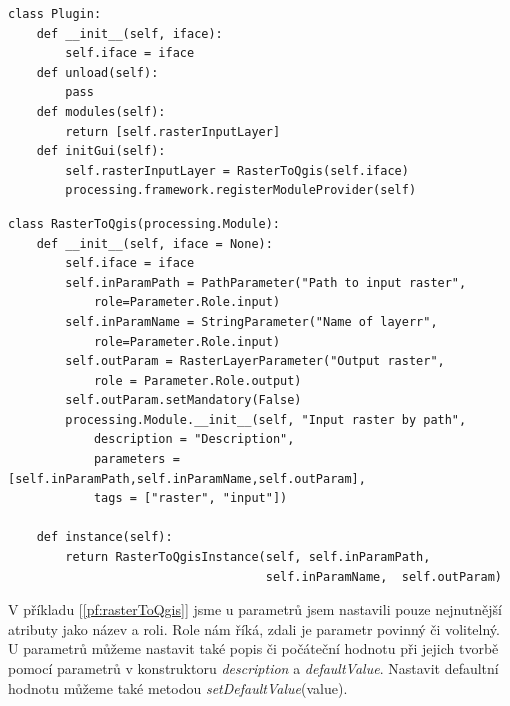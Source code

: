 \newpage
\begin{lstlisting}[caption={Třída Plugin pro QGIS Processing Framework}, label=pf:plugin, morekeywords={Plugin, __init__, modules, initGUI, unload}]
class Plugin:
    def __init__(self, iface):
        self.iface = iface
    def unload(self):
        pass
    def modules(self):
        return [self.rasterInputLayer]
    def initGui(self):
        self.rasterInputLayer = RasterToQgis(self.iface)
        processing.framework.registerModuleProvider(self)
\end{lstlisting}
\newpage
\begin{lstlisting}[caption={Třída RasterToQgis reprezentující modul pro QGIS Processing Framework}, label=pf:rasterToQgis, morekeywords={processing.Module,RasterToQgis, __init__, instance, RasterToQgisInstance, PathParameter, StringParameter, RasterLayerParameter}]
class RasterToQgis(processing.Module):
    def __init__(self, iface = None):
        self.iface = iface
        self.inParamPath = PathParameter("Path to input raster",
        	role=Parameter.Role.input)
        self.inParamName = StringParameter("Name of layerr",
        	role=Parameter.Role.input)
        self.outParam = RasterLayerParameter("Output raster",
        	role = Parameter.Role.output)
        self.outParam.setMandatory(False)
        processing.Module.__init__(self, "Input raster by path", 
            description = "Description",
            parameters = [self.inParamPath,self.inParamName,self.outParam], 
            tags = ["raster", "input"])

    def instance(self):
        return RasterToQgisInstance(self, self.inParamPath,
        							self.inParamName,  self.outParam)
\end{lstlisting}

V příkladu [\autoref{pf:rasterToQgis}] jsme u parametrů jsem nastavili pouze nejnutnější atributy jako název a roli. Role nám říká, zdali je parametr povinný či volitelný. U parametrů můžeme nastavit také popis či počáteční hodnotu při jejich tvorbě pomocí parametrů v konstruktoru \textit{description} a \textit{defaultValue}. Nastavit defaultní hodnotu můžeme také metodou \textit{setDefaultValue}(value). \\

